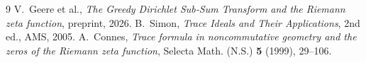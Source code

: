 \documentclass[11pt,a4paper]{article}
\begin{document}
\begin{thebibliography}{9}
 V.~Geere et al., \emph{The Greedy Dirichlet Sub‑Sum Transform and the Riemann zeta function}, preprint, 2026.
 B.~Simon, \emph{Trace Ideals and Their Applications}, 2nd ed., AMS, 2005.
 A.~Connes, \emph{Trace formula in noncommutative geometry and the zeros of the Riemann zeta function}, Selecta Math. (N.S.) \textbf{5} (1999), 29--106.
\end{thebibliography}
\end{document}
